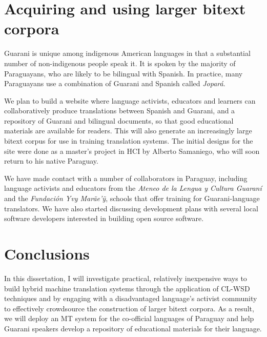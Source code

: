 \documentclass{article}
\begin{document}
\section{Acquiring and using larger bitext corpora}
Guarani is unique among indigenous American languages in that a substantial
number of non-indigenous people speak it. It is spoken by the majority of
Paraguayans, who are likely to be bilingual with Spanish. In practice, many
Paraguayans use a combination of Guarani and Spanish called \emph{Jopar{\'a}}.

We plan to build a website where language activists, educators and learners can
collaboratively produce translations between Spanish and Guarani, and a
repository of Guarani and bilingual documents, so that good educational
materials are available for readers. This will also generate an
increasingly large bitext corpus for use in training translation systems. The
initial designs for the site were done as a master's project in HCI by Alberto
Samaniego, who will soon return to his native Paraguay.

We have made contact with a number of collaborators in Paraguay, including
language activists and educators from the \emph{Ateneo de la Lengua y Cultura
Guaraní} and the \emph{Fundación Yvy Marãe'{\~y}}, schools that offer training
for Guarani-language translators. We have also started discussing development
plans with several local software developers interested in building open source
software.

\section{Conclusions}
In this dissertation, I will investigate practical, relatively inexpensive ways
to build hybrid machine translation systems through the application of CL-WSD
techniques and by engaging with a disadvantaged language's activist community
to effectively crowdsource the construction of larger bitext corpora. As a
result, we will deploy an MT system for the co-official languages of Paraguay
and help Guarani speakers develop a repository of educational materials for
their language.
\end{document}
